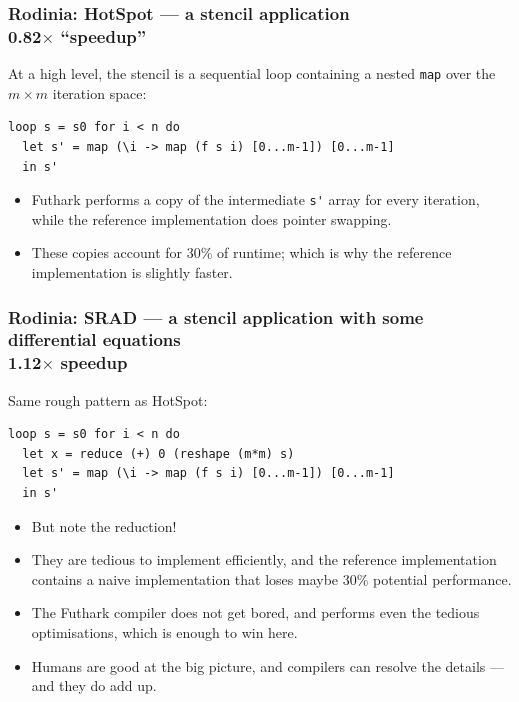 \documentclass[rgb,dvipsnames]{beamer}
\begin{document}
\begin{frame}[fragile]
  \frametitle{Rodinia: HotSpot --- a stencil application\\0.82$\times$ ``speedup''}

  At a high level, the stencil is a sequential loop containing a
  nested \lstinline{map} over the $m\times{}m$ iteration space:

\begin{lstlisting}
loop s = s0 for i < n do
  let s' = map (\i -> map (f s i) [0...m-1]) [0...m-1]
  in s'
\end{lstlisting}

  \begin{itemize}
  \item Futhark performs a copy of the intermediate \lstinline{s'} array for
    every iteration, while the reference implementation does pointer swapping.
  \item These copies account for 30\% of runtime; which is why the
    reference implementation is slightly faster.
  \end{itemize}
\end{frame}

\begin{frame}[fragile]
  \frametitle{Rodinia: SRAD --- a stencil application with some
    differential equations\\1.12$\times$ speedup}

Same rough pattern as HotSpot:

\begin{lstlisting}
loop s = s0 for i < n do
  let x = reduce (+) 0 (reshape (m*m) s)
  let s' = map (\i -> map (f s i) [0...m-1]) [0...m-1]
  in s'
\end{lstlisting}

\begin{itemize}
\item But note the reduction!
\item They are tedious to implement efficiently, and the reference
  implementation contains a naive implementation that loses maybe 30\%
  potential performance.
\item The Futhark compiler does not get bored, and performs even the
  tedious optimisations, which is enough to win here.
\item Humans are good at the big picture, and compilers can resolve
  the details --- and they do add up.
\end{itemize}

\end{frame}
\end{document}
